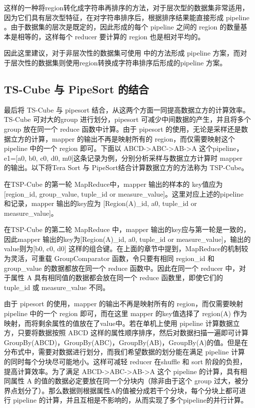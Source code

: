 这样的一种将region转化成字符串再排序的方法，对于层次型的数据集非常适用，因为它们具有层次型特征，在对字符串排序后，根据排序结果能直接形成 pipeline 。由于数据集的层次是既定的，因此形成的每个 pipeline 之间的 region 的数量基本是相等的，这样每个 reducer 要计算的 region 也是相对平均的。

因此这里建议，对于非层次性的数据集可使用 \cite{wang2013scalable} 中的方法形成 pipeline 方案，而对于层次性的数据集则使用region转换成字符串排序后形成的pipeline 方案。

\subsection{TS-Cube 与 PipeSort 的结合}

最后将 TS-Cube 与 pipesort 结合，从这两个方面一同提高数据立方的计算效率。TS-Cube 可对大的group 进行划分，pipesort 可减少中间数据的产生，并且将多个 group 放在同一个 reduce 函数中计算。由于 pipesort 的使用，无论是采样还是数据立方的计算，mapper 的输出不再是映射所有的 region，而仅需要映射这个pipeline 中的一个 region 即可。下面以 ABCD-\textgreater ABC-\textgreater AB-\textgreater A 这个pipeline，e1=[a0, b0, c0, d0, m0]这条记录为例，分别分析采样与数据立方计算时 mapper 的输出。以下将Tera Sort 与 PipeSort结合计算数据立方的方法称为 TSP-Cube。

在TSP-Cube 的第一轮 MapReduce中，mapper 输出的样本的 key值应为[region\_id, group\_value, tuple\_id or measure\_value]。这里对应上述的pipeline 和记录，mapper 输出的key应为 [Region(A)\_id, a0, tuple\_id or measure\_value]。

在TSP-Cube 的第二轮 MapReduce 中，mapper 输出的key应与第一轮是一致的，因此mapper 输出的key为[Region(A)\_id, a0, tuple\_id or measure\_value]，输出的value则为[b0, c0, d0] 这样的组合键。在上面的章节中提到，MapReduce的机制较为灵活，可重载 GroupComparator 函数，令只要有相同 region\_id 和 group\_value 的数据都放在同一个 reduce 函数中。因此在同一个 reducer 中，对于属性 A 具有相同值的数据都会放在同一个 reduce 函数里，即使它们的 tuple\_id 或 measure\_value 不同。

由于 pipesort 的使用，mapper 的输出不再是映射所有的 region，而仅需要映射 pipeline 中的一个 region 即可，而在这里 mapper 的key值选择了 region(A) 作为映射，而将剩余属性的值放在了value中。若在单机上使用 pipeline 计算数据立方，只要将数据按照 ABCD 这样的属性顺序排序，然后对数据扫描一遍即可计算 GroupBy(ABCD)，GroupBy(ABC)，GroupBy(AB)，GroupBy(A)的值。但是在分布式中，需要对数据进行划分，而我们希望数据的划分能在满足 pipeline 计算的同时每个分块尽可能地小。这样可减轻 reducer 在shuffle 和 sort 阶段的负担，提高计算效率。为了满足 ABCD-\textgreater ABC-\textgreater AB-\textgreater A 这个 pipeline 的计算，具有相同属性 A 的值的数据必定要放在同一个分块内（除非由于这个 group 过大，被分界点划分了）。那么数据则根据属性A的值被分成若干个分块，每个分块上都可进行 pipeline 的计算，并且互相是不影响的，从而实现了多个pipeline的并行计算。

